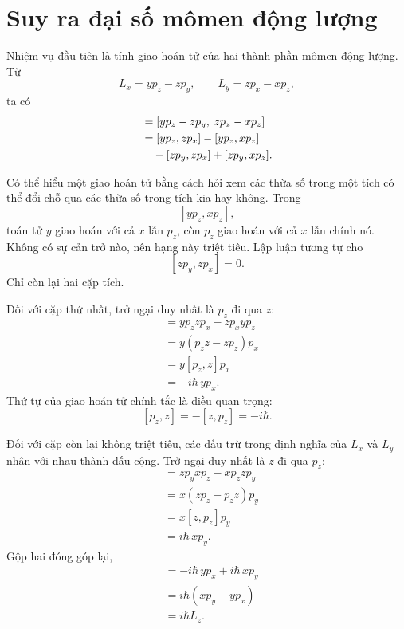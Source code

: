 \section{Suy ra đại số mômen động lượng}

Nhiệm vụ đầu tiên là tính giao hoán tử của hai thành phần mômen động lượng. Từ
\[
L_x=yp_z-zp_y,\qquad
L_y=zp_x-xp_z,
\]
ta có
\begin{align}
[L_x,L_y]
&=[yp_z-zp_y,\;zp_x-xp_z] \\
&=[yp_z,zp_x]-[yp_z,xp_z] \notag\\
&\quad{}-[zp_y,zp_x]+[zp_y,xp_z].
\end{align}

\begin{classroomqa}
\end{classroomqa}

Có thể hiểu một giao hoán tử bằng cách hỏi xem các thừa số trong một tích có thể đổi chỗ qua các thừa số trong tích kia hay không. Trong
\[
[yp_z,xp_z],
\]
toán tử \(y\) giao hoán với cả \(x\) lẫn \(p_z\), còn \(p_z\) giao hoán với cả \(x\) lẫn chính nó. Không có sự cản trở nào, nên hạng này triệt tiêu. Lập luận tương tự cho
\[
[zp_y,zp_x]=0.
\]
Chỉ còn lại hai cặp tích.

Đối với cặp thứ nhất, trở ngại duy nhất là \(p_z\) đi qua \(z\):
\begin{align}
[yp_z,zp_x]
&=yp_zzp_x-zp_xyp_z \\
&=y(p_zz-zp_z)p_x \\
&=y[p_z,z]p_x \\
&=-i\hbar\,yp_x.
\end{align}
Thứ tự của giao hoán tử chính tắc là điều quan trọng:
\[
[p_z,z]=-[z,p_z]=-i\hbar.
\]

Đối với cặp còn lại không triệt tiêu, các dấu trừ trong định nghĩa của \(L_x\) và \(L_y\) nhân với nhau thành dấu cộng. Trở ngại duy nhất là \(z\) đi qua \(p_z\):
\begin{align}
[zp_y,xp_z]
&=zp_yxp_z-xp_zzp_y \\
&=x(zp_z-p_zz)p_y \\
&=x[z,p_z]p_y \\
&=i\hbar\,xp_y.
\end{align}
Gộp hai đóng góp lại,
\begin{align}
[L_x,L_y]
&=-i\hbar\,yp_x+i\hbar\,xp_y \\
&=i\hbar(xp_y-yp_x) \\
&=i\hbar L_z.
\end{align}

